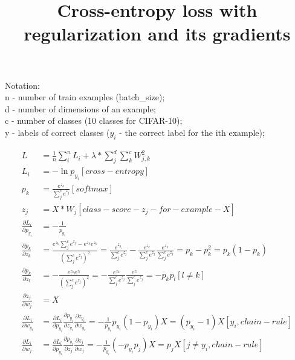 \documentclass{article}
\title{Cross-entropy loss with regularization and its gradients}
\author{}
\date{\vspace{-5ex}}
\begin{document}
  \maketitle
  
  Notation:\\
  n - number of train examples (batch\_size);\\
  d - number of dimensions of an example;\\
  c - number of classes (10 classes for CIFAR-10);\\
  y - labels of correct classes ($y_{i}$ - the correct label for the ith example);

  \begin{align*}
  L &= \frac{1}{n} \sum_{i}^{n} L_{i} 
       + \lambda * \sum_{j}^{d} \sum_{k}^{c} W_{j,k}^{2}\\
  L_{i} &= -\ln{p_{y_{i}}} [cross-entropy]\\
  p_{k} &= \frac {e^{z_{k}}}{\sum_{j}^{c} e^{z_{j}}} [softmax]\\
  z_{j} &= X * W_{j} [class-score-z_{j}-for-example-X]\\
  \frac {\partial L_{i}}{\partial p_{y_{i}}} &= -\frac {1}{p_{y_{i}}}\\
  \frac {\partial p_{k}}{\partial z_{k}} &= 
        \frac {e^{z_{k}}\sum_{j}^{c} e^{z_{j}} - e^{z_{k}}e^{z_{k}}}
              {(\sum_{j}^{c} e^{z_{j}})^2} 
      = \frac {e^{z_{y_{i}}}}{\sum_{j}^{c} e^{z_{j}}}
        -
        \frac {e^{z_{k}}}{\sum_{j}^{c} e^{z_{j}}}
        \frac {e^{z_{k}}}{\sum_{j}^{c} e^{z_{j}}}
      = p_{k} - p_{k}^2
      = p_{k}(1 - p_{k})\\
  \frac {\partial p_{k}}{\partial z_{l}} &= 
        -\frac {e^{z_{k}}e^{z_{l}}}
               {(\sum_{j}^{c} e^{z_{j}})^2}
       = -\frac {e^{z_{k}}}{\sum_{j}^{c} e^{z_{j}}}
          \frac {e^{z_{l}}}{\sum_{j}^{c} e^{z_{j}}} 
       = -p_{k}p_{l} [l \neq k]\\
  \frac {\partial z_{j}}{\partial w_{j}} &= X\\
  \frac {\partial L_{i}}{\partial w_{y_{i}}} &=
         \frac {\partial L_{i}}{\partial p_{y_{i}}}
         \frac {\partial p_{y_{i}}}{\partial z_{y_{i}}}
         \frac {\partial z_{y_{i}}}{\partial w_{y_{i}}}
      = -\frac {1}{p_{y_{i}}}{p_{y_{i}}}(1 - p_{y_{i}})X
      = (p_{y_{i}} - 1)X [y_{i}, chain- rule]\\
  \frac {\partial L_{i}}{\partial w_{j}} &=
         \frac {\partial L_{i}}{\partial p_{y_{i}}}
         \frac {\partial p_{y_{i}}}{\partial z_{j}}
         \frac {\partial z_{j}}{\partial w_{j}}
      = -\frac {1}{p_{y_{i}}}(-p_{y_{i}}p_{j})X
      = p_{j}X [j \neq y_{i}, chain- rule]
  \end{align*}
\end{document}
